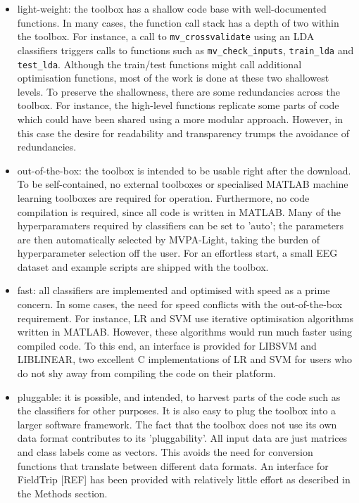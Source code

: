 \documentclass[utf8]{frontiersSCNS} %
\newcommand{\mvpa}{MVPA-Light}
\begin{document}
\begin{itemize}
\item light-weight: the toolbox has a shallow code base with well-documented functions. In many cases, the function call stack has a depth of two within the toolbox. For instance, a call to \texttt{mv\_crossvalidate} using an LDA classifiers triggers calls to functions such as  \texttt{mv\_check\_inputs}, \texttt{train\_lda} and \texttt{test\_lda}. Although the train/test functions might call additional optimisation functions, most of the work is done at these two shallowest levels. To preserve the shallowness, there are some redundancies across the toolbox. For instance, the high-level functions replicate some parts of code which could have been shared using a more modular approach. However, in this case the desire for readability and transparency trumps the avoidance of redundancies.
\item out-of-the-box: the toolbox is intended to be usable right after the download. To be self-contained, no external toolboxes or specialised MATLAB machine learning toolboxes are required for operation. Furthermore, no code compilation is required, since all code is written in MATLAB. Many of the hyperparamaters required by classifiers can be set to 'auto'; the parameters are then automatically selected by \mvpa{}, taking the burden of hyperparameter selection off the user. For an effortless start, a small EEG dataset and example scripts are shipped with the toolbox.
\item fast: all classifiers are implemented and optimised with speed as a prime concern. In some cases, the need for speed conflicts with the out-of-the-box requirement. For instance, LR and SVM use iterative optimisation algorithms written in MATLAB. However, these algorithms would run much faster using compiled code. To this end, an interface is provided for LIBSVM and LIBLINEAR, two excellent C implementations of LR and SVM for users who do not shy away from compiling the code on their platform.
\item pluggable: it is possible, and intended, to harvest parts of the code such as the classifiers for other purposes. It is also easy to plug the toolbox into a larger software framework. The fact that the toolbox does not use its own data format contributes to its 'pluggability'. All input data are just matrices and class labels come as vectors. This avoids the need for conversion functions that translate between different data formats. An interface for FieldTrip [REF] has been provided with relatively little effort as described in the Methods section.
\end{itemize}
\end{document}

